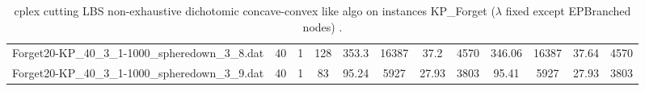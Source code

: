 \begin{sidewaystable}[!ht]
{\begin{tabular}{lccccccccccc}
Forget20-KP\_40\_3\_1-1000\_spheredown\_3\_8.dat & 40 & 1 & 128 & 353.3 & 16387 &  \textcolor{blue2}{37.2} & 4570 & 346.06 & 16387 & 37.64 & 4570 \\
Forget20-KP\_40\_3\_1-1000\_spheredown\_3\_9.dat & 40 & 1 & 83 & 95.24 & 5927 &  \textcolor{blue2}{27.93} & 3803 & 95.41 & 5927 &  \textcolor{blue2}{27.93} & 3803 \\
\bottomrule
\end{tabular}
}%
\caption{cplex cutting LBS non-exhaustive dichotomic concave-convex like algo on instances KP_Forget ($\lambda$ fixed except EPBranched nodes) .}
\end{sidewaystable}
